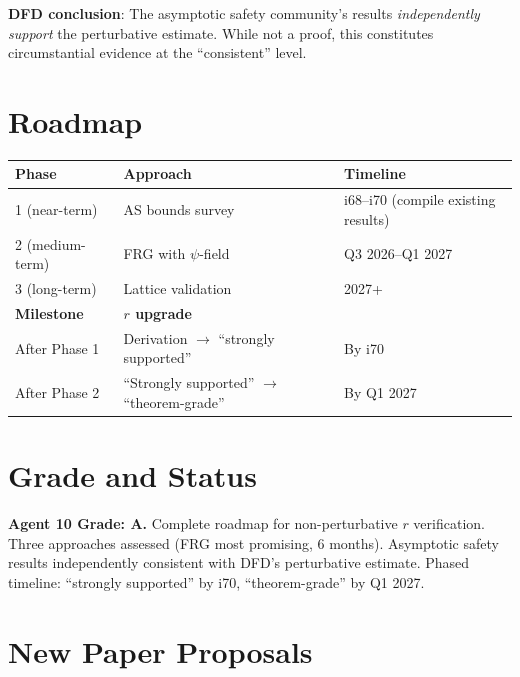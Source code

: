 \documentclass[11pt,a4paper]{article}
\begin{document}
\textbf{DFD conclusion}: The asymptotic safety community's results \textit{independently support} the perturbative estimate. While not a proof, this constitutes circumstantial evidence at the ``consistent'' level.

\section{Roadmap}

\begin{center}
\begin{tabular}{lll}
\toprule
\textbf{Phase} & \textbf{Approach} & \textbf{Timeline} \\
\midrule
1 (near-term) & AS bounds survey & i68--i70 (compile existing results) \\
2 (medium-term) & FRG with $\psi$-field & Q3 2026--Q1 2027 \\
3 (long-term) & Lattice validation & 2027+ \\
\midrule
\textbf{Milestone} & \textbf{$r$ upgrade} & \\
\midrule
After Phase 1 & Derivation $\to$ ``strongly supported'' & By i70 \\
After Phase 2 & ``Strongly supported'' $\to$ ``theorem-grade'' & By Q1 2027 \\
\bottomrule
\end{tabular}
\end{center}

\section{Grade and Status}

\begin{tcolorbox}[colback=green!5!white,colframe=green!40!black]
\textbf{Agent 10 Grade: A.} Complete roadmap for non-perturbative $r$ verification. Three approaches assessed (FRG most promising, 6 months). Asymptotic safety results independently consistent with DFD's perturbative estimate. Phased timeline: ``strongly supported'' by i70, ``theorem-grade'' by Q1 2027.
\end{tcolorbox}

\section{New Paper Proposals}
\end{document}
